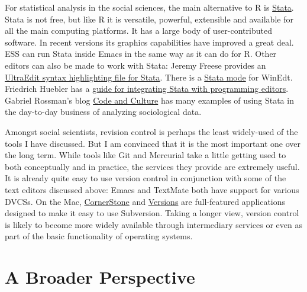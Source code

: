 \documentclass[11pt,article,oneside]{memoir}
\begin{document}
For statistical analysis in the social sciences, the main alternative
to R is \href{http://www.stata.com/}{Stata}. Stata is not free, but
like R it is versatile, powerful, extensible and available for all the
main computing platforms. It has a large body of user-contributed
software. In recent versions its graphics capabilities have improved a
great deal. ESS can run Stata inside Emacs in the same way as it can
do for R. Other editors can also be made to work with Stata: Jeremy
Freese provides an
\href{http://www.jeremyfreese.com/#other%20research}{UltraEdit syntax highlighting file for Stata}.  There is a \href{http://www.winedt.org/Config/modes/Stata.php}{Stata mode}
  for WinEdt. Friedrich Huebler has a
  \href{http://mysite.verizon.net/huebler/2005/20050310_Stata_editor.html}{guide
    for integrating Stata with programming editors}. Gabriel Rossman's
  blog \href{http://codeandculture.wordpress.com/tag/stata/}{Code and
    Culture} has many examples of using Stata in the day-to-day
  business of analyzing sociological data.

  Amongst social scientists, revision control is perhaps the least
  widely-used of the tools I have discussed. But I am convinced that
  it is the most important one over the long term. While tools like
  Git and Mercurial take a little getting used to both conceptually
  and in practice, the services they provide are extremely useful. It
  is already quite easy to use version control in conjunction with
  some of the text editors discussed above: Emacs and TextMate both
  have support for various DVCSs. On the Mac,
  \href{http://www.zennaware.com/cornerstone/}{CornerStone} and
  \href{http://www.versionsapp.com/}{Versions} are full-featured
  applications designed to make it easy to use Subversion. Taking a
  longer view, version control is likely to become more widely
  available through intermediary services or even as part of the basic
  functionality of operating systems.


\section*{A Broader Perspective}
\label{sec-9}
\end{document}
